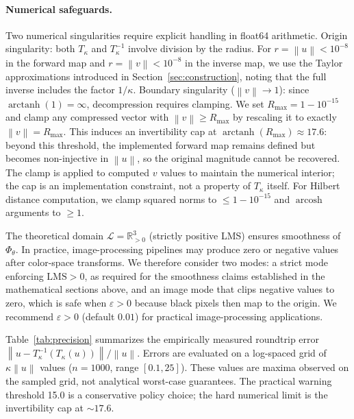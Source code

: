 \documentclass[11pt]{article}
\theoremstyle{plain}
\theoremstyle{definition}
\theoremstyle{remark}
\newcommand{\Rpp}{\mathbb{R}_{> 0}}     %
\newcommand{\norm}[1]{\left\lVert #1 \right\rVert}
\begin{document}
\paragraph{Numerical safeguards.} Two numerical singularities require explicit handling in float64 arithmetic. Origin singularity: both $T_\kappa$ and $T_\kappa^{-1}$ involve division by the radius. For $r = \norm{u} < 10^{-8}$ in the forward map and $r = \norm{v} < 10^{-8}$ in the inverse map, we use the Taylor approximations introduced in Section~\ref{sec:construction}, noting that the full inverse includes the factor $1/\kappa$. Boundary singularity ($\norm{v} \to 1$): since $\operatorname{arctanh}(1) = \infty$, decompression requires clamping. We set $R_{\max} = 1 - 10^{-15}$ and clamp any compressed vector with $\norm{v} \geq R_{\max}$ by rescaling it to exactly $\norm{v} = R_{\max}$. This induces an invertibility cap at $\operatorname{arctanh}(R_{\max}) \approx 17.6$: beyond this threshold, the implemented forward map remains defined but becomes non-injective in $\norm{u}$, so the original magnitude cannot be recovered. The clamp is applied to computed $v$ values to maintain the numerical interior; the cap is an implementation constraint, not a property of $T_\kappa$ itself. For Hilbert distance computation, we clamp squared norms to $\leq 1 - 10^{-15}$ and $\operatorname{arcosh}$ arguments to $\geq 1$.

The theoretical domain $\mathcal{L} = \Rpp^3$ (strictly positive LMS) ensures smoothness of $\Phi_\theta$. In practice, image-processing pipelines may produce zero or negative values after color-space transforms. We therefore consider two modes: a strict mode enforcing $\mathrm{LMS} > 0$, as required for the smoothness claims established in the mathematical sections above, and an image mode that clips negative values to zero, which is safe when $\varepsilon > 0$ because black pixels then map to the origin. We recommend $\varepsilon > 0$ (default $0.01$) for practical image-processing applications.

Table~\ref{tab:precision} summarizes the empirically measured roundtrip error $\norm{u - T_\kappa^{-1}(T_\kappa(u))}/\norm{u}$. Errors are evaluated on a log-spaced grid of $\kappa\norm{u}$ values ($n=1000$, range $[0.1,25]$). These values are maxima observed on the sampled grid, not analytical worst-case guarantees. The practical warning threshold 15.0 is a conservative policy choice; the hard numerical limit is the invertibility cap at $\sim 17.6$.
\end{document}
